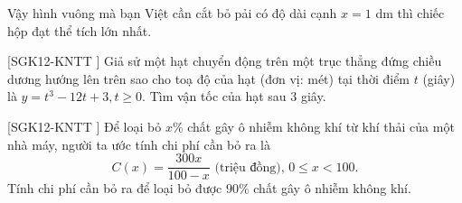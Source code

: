 \begin{bt}
{\begin{enumerate}
\begin{enumerate}
\begin{itemize}
\begin{center}
					\end{center}
				\end{itemize}
			\end{enumerate}
			Vậy hình vuông mà bạn Việt cần cắt bỏ pải có độ dài cạnh $x=1$ dm thì chiếc hộp đạt thể tích lớn nhất.
		\end{enumerate}
	}
\end{bt}

\begin{bt}%
 [SGK12-KNTT ]
	Giả sử một hạt chuyển động trên một trục thẳng đứng chiều dương hướng lên trên sao cho toạ độ của hạt (đơn vị: mét) tại thời điểm $t$ (giây) là $y=t^3-12t+3, t \geq 0$. Tìm vận tốc của hạt sau $3$ giây.
\end{bt}

\begin{bt}%
[SGK12-KNTT ]
	Để loại bỏ $x\%$ chất gây ô nhiễm không khí từ khí thải của một nhà máy, người ta ước tính chi phí cần bỏ ra là
	$$
	C(x)=\dfrac{300 x}{100-x} \text { (triệu đồng), } 0 \leq x < 100.
	$$		
	Tính chi phí cần bỏ ra để loại bỏ được $90 \%$ chất gây ô nhiễm không khí.
\end{bt}

